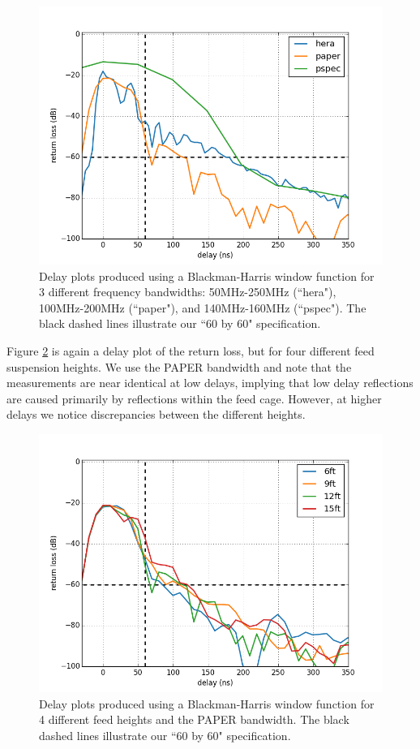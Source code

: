 \documentclass[12pt,preprint]{aastex}
\begin{document}
\begin{figure}
\centering
\includegraphics[totalheight=0.5\textheight]{plots/delay3_window.png}
\caption{Delay plots produced using a Blackman-Harris window function for 3 different frequency bandwidths: 50MHz-250MHz (``hera"), 100MHz-200MHz (``paper"), and 140MHz-160MHz (``pspec"). The black dashed lines illustrate our ``60 by 60" specification.}
\label{fig:3bands}
\end{figure}

Figure \ref{fig:elevator} is again a delay plot of the return loss, but for four different feed suspension heights. We use the PAPER bandwidth and note that the measurements are near identical at low delays, implying that low delay reflections are caused primarily by reflections within the feed cage. However, at higher delays we notice discrepancies between the different heights.

\begin{figure}
\centering
\includegraphics[totalheight=0.5\textheight]{plots/delay_heights_paper.png}
\caption{Delay plots produced using a Blackman-Harris window function for 4 different feed heights and the PAPER bandwidth. The black dashed lines illustrate our ``60 by 60" specification.}
\label{fig:elevator}
\end{figure}
\end{document}

